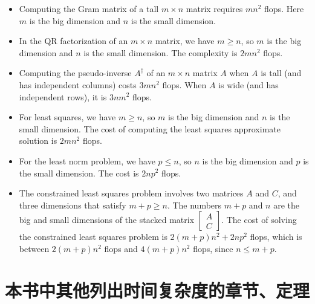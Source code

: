 \begin{itemize}
    \item Computing the Gram matrix of a tall $ m \times n $ matrix requires $ m n^{2} $ flops. Here $ m $ is the big dimension and $ n $ is the small dimension.
    \item In the QR factorization of an $ m \times n $ matrix, we have $ m \geq n $, so $ m $ is the big dimension and $ n $ is the small dimension. The complexity is $ 2 m n^{2} $ flops.
    \item Computing the pseudo-inverse $ A^{\dagger} $ of an $ m \times n $ matrix $ A $ when $ A $ is tall (and has independent columns) costs $ 3 m n^{2} $ flops. When $ A $ is wide (and has independent rows), it is $ 3 n m^{2} $ flops.
    \item For least squares, we have $ m \geq n $, so $ m $ is the big dimension and $ n $ is the small dimension. The cost of computing the least squares approximate solution is $ 2 m n^{2} $ flops.
    \item For the least norm problem, we have $ p \leq n $, so $ n $ is the big dimension and $ p $ is the small dimension. The cost is $ 2 n p^{2} $ flops.
    \item The constrained least squares problem involves two matrices $ A $ and $ C $, and three dimensions that satisfy $ m+p \geq n $. The numbers $ m+p $ and $ n $ are the big and small dimensions of the stacked matrix $ \left[\begin{array}{c}A \\ C\end{array}\right] $. The cost of solving the constrained least squares problem is $ 2(m+p) n^{2}+2 n p^{2} $ flops, which is between $ 2(m+p) n^{2} $ flops and $ 4(m+p) n^{2} $ flops, since $ n \leq m+p $.
\end{itemize}

\section{本书中其他列出时间复杂度的章节、定理}

